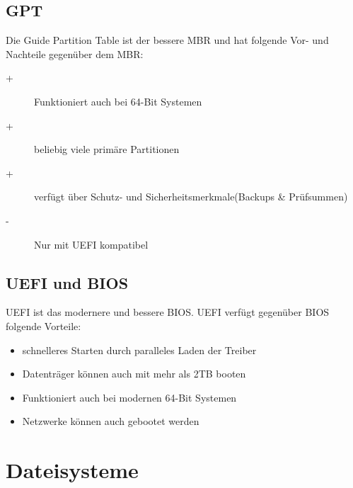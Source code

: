 \documentclass[12pt,a4paper]{article}
\begin{document}
\subsection{GPT}
    Die Guide Partition Table ist der bessere MBR und hat folgende Vor- und Nachteile gegenüber dem MBR:
	\begin{description}
    	\item[+]{Funktioniert auch bei 64-Bit Systemen}
    	\item[+]{beliebig viele primäre Partitionen}
    	\item[+]{verfügt über Schutz- und Sicherheitsmerkmale(Backups \& Prüfsummen)}
    	\item[-]{Nur mit UEFI kompatibel}
	\end{description}

\subsection{UEFI und BIOS}
    UEFI ist das modernere und bessere BIOS. UEFI verfügt gegenüber BIOS folgende Vorteile:
	\begin{itemize}
    	\item schnelleres Starten durch paralleles Laden der Treiber
    	\item Datenträger können auch mit mehr als 2TB booten
    	\item Funktioniert auch bei modernen 64-Bit Systemen
    	\item Netzwerke können auch gebootet werden
	\end{itemize}

\section{Dateisysteme}
\end{document}
